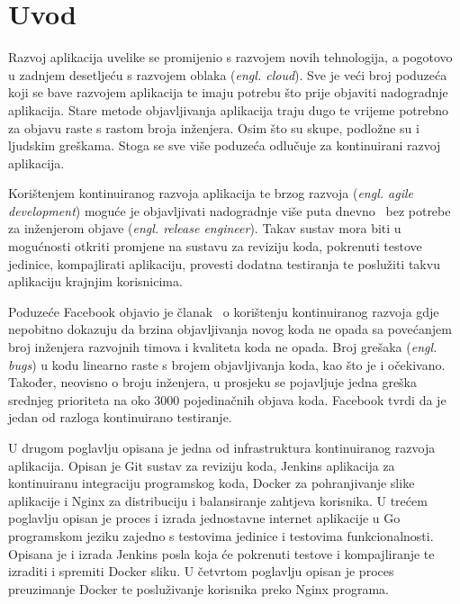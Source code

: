 \chapter{Uvod}
Razvoj aplikacija uvelike se promijenio s razvojem novih tehnologija, a pogotovo u zadnjem desetljeću
s razvojem oblaka (\textit{engl. cloud}). Sve je veći broj poduzeća koji se bave razvojem aplikacija
te imaju potrebu što prije objaviti nadogradnje aplikacija. Stare metode objavljivanja aplikacija
traju dugo te vrijeme potrebno za objavu raste s rastom broja inženjera. Osim što su skupe,
podložne su i ljudskim greškama. Stoga se sve više poduzeća odlučuje za kontinuirani razvoj
aplikacija.

Korištenjem kontinuiranog razvoja aplikacija te brzog razvoja (\textit{engl. agile development})
moguće je objavljivati nadogradnje više puta dnevno~\citep{abrahamsson2017agile} bez potrebe za
inženjerom objave (\textit{engl. release engineer}). Takav sustav mora biti u mogućnosti otkriti
promjene na sustavu za reviziju koda, pokrenuti testove jedinice, kompajlirati aplikaciju, provesti
dodatna testiranja te poslužiti takvu aplikaciju krajnjim korisnicima.

Poduzeće Facebook objavio je članak~\citep{rossi2016continuous} o korištenju kontinuiranog razvoja
gdje nepobitno dokazuju da brzina objavljivanja novog koda ne opada sa povećanjem broj inženjera
razvojnih timova i kvaliteta koda ne opada. Broj grešaka (\textit{engl. bugs}) u kodu linearno raste
s brojem objavljivanja koda, kao što je i očekivano. Također, neovisno o broju inženjera, u
prosjeku se pojavljuje jedna greška srednjeg prioriteta na oko 3000 pojedinačnih objava koda.
Facebook tvrdi da je jedan od razloga kontinuirano testiranje.

U drugom poglavlju opisana je jedna od infrastruktura kontinuiranog razvoja aplikacija. Opisan je
Git sustav za reviziju koda, Jenkins aplikacija za kontinuiranu integraciju programskog koda,
Docker za pohranjivanje slike aplikacije i Nginx za distribuciju i balansiranje zahtjeva korisnika.
U trećem poglavlju opisan je proces i izrada jednostavne internet aplikacije u Go programskom jeziku
zajedno s testovima jedinice i testovima funkcionalnosti. Opisana je i izrada Jenkins posla koja će
pokrenuti testove i kompajliranje te izraditi i spremiti Docker sliku. U četvrtom poglavlju opisan
je proces preuzimanje Docker te posluživanje korisnika preko Nginx programa.

